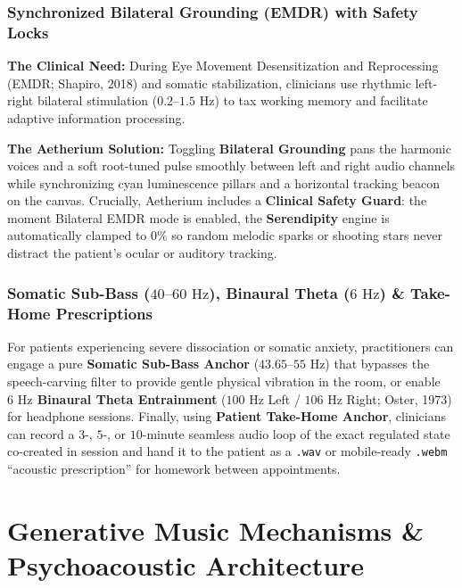 \documentclass[11pt,oneside,openany]{book}
\begin{document}
\subsection{Synchronized Bilateral Grounding (EMDR) with Safety Locks}
\textbf{The Clinical Need:} During Eye Movement Desensitization and Reprocessing (EMDR; Shapiro, 2018) and somatic stabilization, clinicians use rhythmic left-right bilateral stimulation ($0.2\text{--}1.5\text{ Hz}$) to tax working memory and facilitate adaptive information processing.

\textbf{The Aetherium Solution:} Toggling \textbf{Bilateral Grounding} pans the harmonic voices and a soft root-tuned pulse smoothly between left and right audio channels while synchronizing cyan luminescence pillars and a horizontal tracking beacon on the canvas. Crucially, Aetherium includes a \textbf{Clinical Safety Guard}: the moment Bilateral EMDR mode is enabled, the \textbf{Serendipity} engine is automatically clamped to $0\%$ so random melodic sparks or shooting stars never distract the patient's ocular or auditory tracking.

\subsection{Somatic Sub-Bass ($40\text{--}60\text{ Hz}$), Binaural Theta ($6\text{ Hz}$) \& Take-Home Prescriptions}
For patients experiencing severe dissociation or somatic anxiety, practitioners can engage a pure \textbf{Somatic Sub-Bass Anchor} ($43.65\text{--}55\text{ Hz}$) that bypasses the speech-carving filter to provide gentle physical vibration in the room, or enable \textbf{$6\text{ Hz}$ Binaural Theta Entrainment} ($100\text{ Hz}$ Left / $106\text{ Hz}$ Right; Oster, 1973) for headphone sessions. Finally, using \textbf{Patient Take-Home Anchor}, clinicians can record a $3$-, $5$-, or $10$-minute seamless audio loop of the exact regulated state co-created in session and hand it to the patient as a \texttt{.wav} or mobile-ready \texttt{.webm} ``acoustic prescription'' for homework between appointments.

\chapter[Generative Mechanisms \& DSP]{Generative Music Mechanisms \& Psychoacoustic Architecture}
\end{document}
